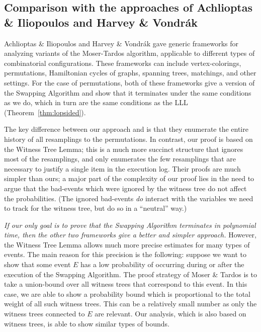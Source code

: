 \subsection{Comparison with the approaches of Achlioptas \& Iliopoulos and Harvey \& Vondr\'{a}k}
\label{achlioptas-sec}
Achlioptas \& Iliopoulos \cite{achlioptas} and Harvey \& Vondr\'{a}k \cite{harvey} gave generic frameworks for analyzing variants of the Moser-Tardos algorithm, applicable to different types of combinatorial configurations. These frameworks can include vertex-colorings, permutations, Hamiltonian cycles of graphs, spanning trees, matchings, and other settings. For the case of permutations, both of these frameworks give a version of the Swapping Algorithm and show that it terminates under the same conditions as we do, which in turn are the same conditions as the LLL (Theorem~\ref{thm:lopsided}).

The key difference between our approach and \cite{achlioptas,harvey} is that they enumerate the entire history of all resamplings to the permutations. In contrast, our proof is based on the Witness Tree Lemma; this is a much more succinct structure that ignores most of the resamplings, and only enumerates the few resamplings that are necessary to justify a single item in the execution log. Their proofs are much simpler than ours; a major part of the complexity of our proof lies in the need to argue that the bad-events which were ignored by the witness tree do not affect the probabilities. (The ignored bad-events \emph{do} interact with the variables we need to track for the witness tree, but do so in a ``neutral'' way.) 

\emph{If our only goal is to prove that the Swapping Algorithm terminates in polynomial time, then the other two frameworks give a better and simpler approach.}
However, the Witness Tree Lemma allows much more precise estimates for many types of events. The main reason for this precision is the following: suppose we want to show that some event $E$ has a low probability of occurring during or after the execution of the Swapping Algorithm. The proof strategy of Moser \& Tardos is to take a union-bound over all witness trees that correspond to this event. In this case, we are able to show a probability bound which is proportional to the total weight of all such witness trees. This can be a relatively small number as only the witness trees connected to $E$ are relevant. Our analysis, which is also based on witness trees, is able to show similar types of bounds.

